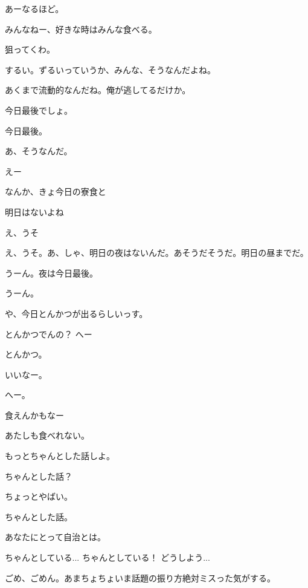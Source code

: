 \begin{multicols}{3}
{        あーなるほど。

        みんなねー、好きな時はみんな食べる。

        狙ってくわ。

        するい。ずるいっていうか、みんな、そうなんだよね。

        あくまで流動的なんだね。俺が逃してるだけか。

        今日最後でしょ。

        今日最後。

        あ、そうなんだ。

        えー

        なんか、きょ今日の寮食と

        明日はないよね

        え、うそ

        え、うそ。あ、しゃ、明日の夜はないんだ。あそうだそうだ。明日の昼までだ。

        うーん。夜は今日最後。

        うーん。

        や、今日とんかつが出るらしいっす。

        とんかつでんの？ へー

        とんかつ。

        いいなー。

        へー。

        食えんかもなー

        あたしも食べれない。

        もっとちゃんとした話しよ。

        ちゃんとした話？

        ちょっとやばい。

        ちゃんとした話。

        あなたにとって自治とは。

        ちゃんとしている... ちゃんとしている！ どうしよう...

        ごめ、ごめん。あまちょちょいま話題の振り方絶対ミスった気がする。

}
\end{multicols}
